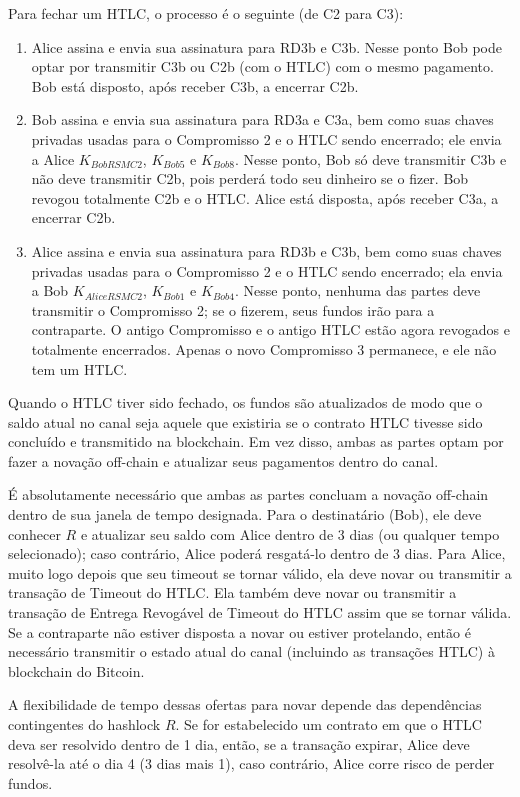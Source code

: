 \documentclass[letterpaper,11pt]{article}
\begin{document}
Para fechar um HTLC, o processo é o seguinte (de C2 para C3):

\begin{enumerate}
	\item Alice assina e envia sua assinatura para RD3b e C3b. Nesse
		ponto Bob pode optar por transmitir C3b ou C2b (com o HTLC)
		com o mesmo pagamento. Bob está disposto, após receber C3b,
		a encerrar C2b.
	\item Bob assina e envia sua assinatura para RD3a e C3a, bem como suas
		chaves privadas usadas para o Compromisso 2 e o HTLC sendo
		encerrado; ele envia a Alice $K_{BobRSMC2}$, $K_{Bob5}$ e
		$K_{Bob8}$. Nesse ponto, Bob só deve transmitir C3b e não
		deve transmitir C2b, pois perderá todo seu dinheiro se o
		fizer. Bob revogou totalmente C2b e o HTLC. Alice está
		disposta, após receber C3a, a encerrar C2b.
	\item Alice assina e envia sua assinatura para RD3b e C3b, bem como
		suas chaves privadas usadas para o Compromisso 2 e o HTLC
		sendo encerrado; ela envia a Bob $K_{AliceRSMC2}$, $K_{Bob1}$
		e $K_{Bob4}$. Nesse ponto, nenhuma das partes deve transmitir
		o Compromisso 2; se o fizerem, seus fundos irão para a
		contraparte. O antigo Compromisso e o antigo HTLC estão agora
		revogados e totalmente encerrados. Apenas o novo Compromisso
		3 permanece, e ele não tem um HTLC.
\end{enumerate}

Quando o HTLC tiver sido fechado, os fundos são atualizados de modo que o
saldo atual no canal seja aquele que existiria se o contrato HTLC tivesse
sido concluído e transmitido na blockchain. Em vez disso, ambas as partes
optam por fazer a novação off-chain e atualizar seus pagamentos dentro do
canal.

É absolutamente necessário que ambas as partes concluam a novação off-chain
dentro de sua janela de tempo designada. Para o destinatário (Bob), ele
deve conhecer $R$ e atualizar seu saldo com Alice dentro de 3 dias (ou
qualquer tempo selecionado); caso contrário, Alice poderá resgatá-lo
dentro de 3 dias. Para Alice, muito logo depois que seu timeout se tornar
válido, ela deve novar ou transmitir a transação de Timeout do HTLC. Ela
também deve novar ou transmitir a transação de Entrega Revogável de
Timeout do HTLC assim que se tornar válida. Se a contraparte não estiver
disposta a novar ou estiver protelando, então é necessário transmitir o
estado atual do canal (incluindo as transações HTLC) à blockchain do
Bitcoin.

A flexibilidade de tempo dessas ofertas para novar depende das dependências
contingentes do hashlock $R$. Se for estabelecido um contrato em que o HTLC
deva ser resolvido dentro de 1 dia, então, se a transação expirar, Alice
deve resolvê-la até o dia 4 (3 dias mais 1), caso contrário, Alice corre
risco de perder fundos.
\end{document}
